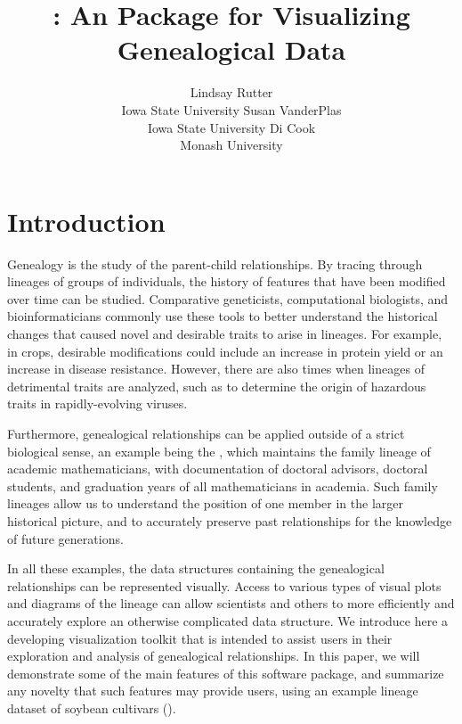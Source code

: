 \documentclass[article,shortnames]{jss}
\author{Lindsay Rutter\\Iowa State University \And 
        Susan VanderPlas\\Iowa State University \And
        Di Cook\\Monash University}
\title{\pkg{ggenealogy}: An \proglang{R} Package for Visualizing Genealogical Data}
\begin{document}


\section{Introduction}

Genealogy is the study of the parent-child relationships. By tracing through lineages of groups of individuals, the history of features that have been modified over time can be studied. Comparative geneticists, computational biologists, and bioinformaticians commonly use these tools to better understand the historical changes that caused novel and desirable traits to arise in lineages. For example, in crops, desirable modifications could include an increase in protein yield or an increase in disease resistance. However, there are also times when lineages of detrimental traits are analyzed, such as to determine the origin of hazardous traits in rapidly-evolving viruses.

Furthermore, genealogical relationships can be applied outside of a strict biological sense, an example being the \citealt{mgp}, which maintains the family lineage of academic mathematicians, with documentation of doctoral advisors, doctoral students, and graduation years of all mathematicians in academia. Such family lineages allow us to understand the position of one member in the larger historical picture, and to accurately preserve past relationships for the knowledge of future generations.

In all these examples, the data structures containing the genealogical relationships can be represented visually. Access to various types of visual plots and diagrams of the lineage can allow scientists and others to more efficiently and accurately explore an otherwise complicated data structure. We introduce here a developing visualization toolkit that is intended to assist users in their exploration and analysis of genealogical relationships. In this paper, we will demonstrate some of the main features of this software package, and summarize any novelty that such features may provide users, using an example lineage dataset of soybean cultivars (\citealt{soybean}).
\end{document}
